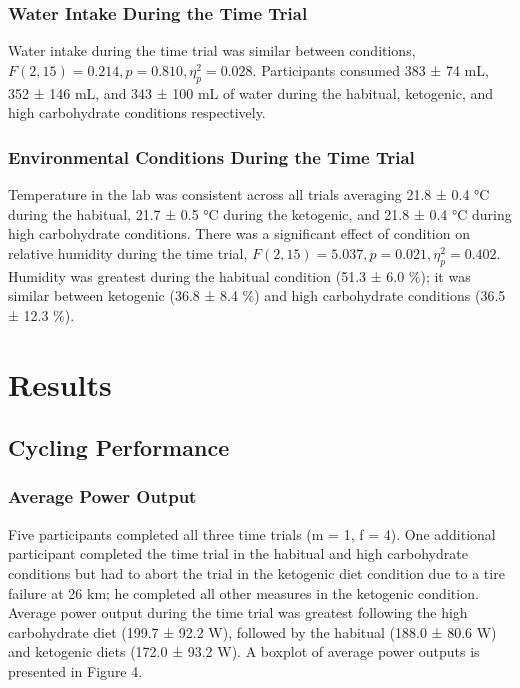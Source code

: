 \documentclass[]{cik}%
\begin{document}
\hypertarget{water-intake-during-the-time-trial}{%
\subsubsection{Water Intake During the Time
Trial}\label{water-intake-during-the-time-trial}}

Water intake during the time trial was similar between conditions,
\(F(2, 15) = 0.214, p = 0.810, \eta^2_p = 0.028\). Participants consumed
383 ± 74 mL, 352 ± 146 mL, and 343 ± 100 mL of water during the
habitual, ketogenic, and high carbohydrate conditions respectively.

\hypertarget{environmental-conditions-during-the-time-trial}{%
\subsubsection{Environmental Conditions During the Time
Trial}\label{environmental-conditions-during-the-time-trial}}

Temperature in the lab was consistent across all trials averaging 21.8 ±
0.4 °C during the habitual, 21.7 ± 0.5 °C during the ketogenic, and 21.8
± 0.4 °C during high carbohydrate conditions. There was a significant
effect of condition on relative humidity during the time trial,
\(F(2, 15) = 5.037, p = 0.021, \eta^2_p = 0.402\). Humidity was greatest
during the habitual condition (51.3 ± 6.0 \%); it was similar between
ketogenic (36.8 ± 8.4 \%) and high carbohydrate conditions (36.5 ± 12.3
\%).

\hypertarget{results}{%
\section{Results}\label{results}}

\hypertarget{cycling-performance}{%
\subsection{Cycling Performance}\label{cycling-performance}}

\hypertarget{average-power-output}{%
\subsubsection{Average Power Output}\label{average-power-output}}

Five participants completed all three time trials (m = 1, f = 4). One
additional participant completed the time trial in the habitual and high
carbohydrate conditions but had to abort the trial in the ketogenic diet
condition due to a tire failure at 26 km; he completed all other
measures in the ketogenic condition. Average power output during the
time trial was greatest following the high carbohydrate diet (199.7 ±
92.2 W), followed by the habitual (188.0 ± 80.6 W) and ketogenic diets
(172.0 ± 93.2 W). A boxplot of average power outputs is presented in
Figure 4.
\end{document}
